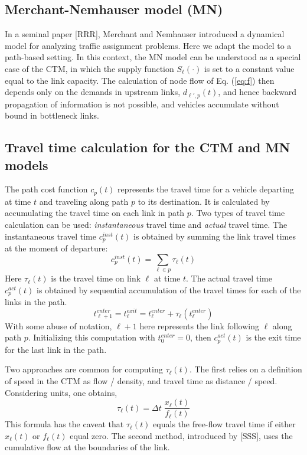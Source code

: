 \subsection{Merchant-Nemhauser model (MN)}
In a seminal paper [RRR], Merchant and Nemhauser introduced a dynamical model for analyzing traffic assignment problems. Here we adapt the model to a path-based setting. In this context, the MN model can be understood as a special case of the CTM, in which the supply function $S_\ell(\cdot)$ is set to a constant value equal to the link capacity. The calculation of node flow of Eq. (\ref{eq:f}) then depends only on the demands in upstream links, $d_{\ell',p}(t)$, and hence backward propagation of information is not possible, and vehicles accumulate without bound in bottleneck links.

\subsection{Travel time calculation for the CTM and MN models}
The path cost function $c_p(t)$ represents the travel time for a vehicle departing at time $t$ and traveling along path $p$ to its destination. It is calculated by accumulating the travel time on each link in path $p$. Two types of travel time calculation can be used: \textit{instantaneous} travel time and \textit{actual} travel time. The instantaneous travel time $c_p^{inst}(t)$ is obtained by summing the link travel times at the moment of departure:
\begin{equation}
c_p^{inst}(t) = \sum_{\ell\in p} \tau_\ell(t)
\end{equation}
Here $\tau_\ell(t)$ is the travel time on link $\ell$ at time $t$. The actual travel time $c_p^{act}(t)$ is obtained by sequential accumulation of the travel times for each of the links in the path.
\begin{equation}
t^{enter}_{\ell+1} = t^{exit}_{\ell} = t^{enter}_{\ell} + \tau_{\ell}(t^{enter}_{\ell})
\end{equation}
With some abuse of notation, $\ell+1$ here represents the link following $\ell$ along path $p$.
Initializing this computation with $t^{enter}_{0}=0$, then $c_p^{act}(t)$ is the exit time for the last link in the path.

Two approaches are common for computing $\tau_\ell(t)$. The first relies on a definition of speed in the CTM as flow / density, and travel time as distance / speed. Considering units, one obtains,
\begin{equation}
\tau_\ell(t) = \Delta t \; \frac{x_\ell(t)}{f_\ell(t)}
\end{equation}
This formula has the caveat that $\tau_\ell(t)$ equals the free-flow travel time if either $x_\ell(t)$ or $f_\ell(t)$ equal zero. The second method, introduced by [SSS], uses the cumulative flow at the boundaries of the link. 

